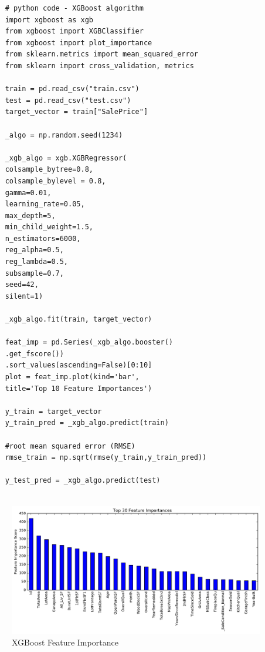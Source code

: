 \documentclass[sigconf]{acmart}
\begin{document}
	\begin{verbatim}
	# python code - XGBoost algorithm
	import xgboost as xgb
	from xgboost import XGBClassifier
	from xgboost import plot_importance
	from sklearn.metrics import mean_squared_error
	from sklearn import cross_validation, metrics
	
	train = pd.read_csv("train.csv")
	test = pd.read_csv("test.csv")
	target_vector = train["SalePrice"]
	
	_algo = np.random.seed(1234)
	
	_xgb_algo = xgb.XGBRegressor(
	colsample_bytree=0.8,
	colsample_bylevel = 0.8,
	gamma=0.01,
	learning_rate=0.05,
	max_depth=5,
	min_child_weight=1.5,
	n_estimators=6000,                                                                  
	reg_alpha=0.5,
	reg_lambda=0.5,
	subsample=0.7,
	seed=42,
	silent=1)
	
	_xgb_algo.fit(train, target_vector)   
	
	feat_imp = pd.Series(_xgb_algo.booster()
	.get_fscore())
	.sort_values(ascending=False)[0:10] 
	plot = feat_imp.plot(kind='bar', 
	title='Top 10 Feature Importances')
	
	y_train = target_vector
	y_train_pred = _xgb_algo.predict(train)
	
	#root mean squared error (RMSE)
	rmse_train = np.sqrt(rmse(y_train,y_train_pred))
	
	y_test_pred = _xgb_algo.predict(test)
	
	\end{verbatim}
	
	
	\begin{figure}[H]
		\centering
		\includegraphics[width=0.75\columnwidth]{images/xgboost_feature_importance}	
		\caption{XGBoost Feature Importance} \label{fig:xgb_feature_imp} 
	\end{figure}
	
	
\end{document}
